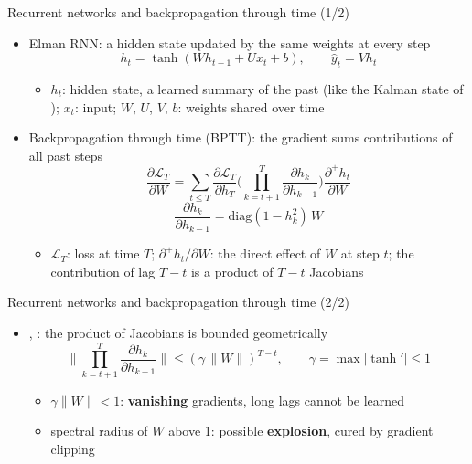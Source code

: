 \begin{frame}{Recurrent networks and backpropagation through time (1/2)}
\itemsize{\small}
\begin{itemize}
    \item Elman RNN: a hidden state updated by the same weights at every step
    \[ h_t = \tanh(W h_{t-1} + U x_t + b), \qquad \hat y_t = V h_t \]
    \begin{itemize}
        \item $h_t$: hidden state, a learned summary of the past (like the Kalman state of ); $x_t$: input; $W$, $U$, $V$, $b$: weights shared over time
    \end{itemize}
    \item Backpropagation through time (BPTT): the gradient sums contributions of all past steps
    \[ \frac{\partial\mathcal L_T}{\partial W} = \sum_{t\le T}\frac{\partial\mathcal L_T}{\partial h_T}\Big(\prod_{k=t+1}^T\frac{\partial h_k}{\partial h_{k-1}}\Big)\frac{\partial^+ h_t}{\partial W} \]
    \[ \frac{\partial h_k}{\partial h_{k-1}} = \mathrm{diag}(1 - h_k^2)\,W \]
    \begin{itemize}
        \item $\mathcal L_T$: loss at time $T$; $\partial^+h_t/\partial W$: the direct effect of $W$ at step $t$; the contribution of lag $T - t$ is a product of $T - t$ Jacobians
    \end{itemize}
\end{itemize}
\end{frame}

\begin{frame}{Recurrent networks and backpropagation through time (2/2)}
\itemsize{\small}
\begin{itemize}
    \item {}, : the product of Jacobians is bounded geometrically
    \[ \Big\|\prod_{k=t+1}^T\frac{\partial h_k}{\partial h_{k-1}}\Big\| \le (\gamma\,\|W\|)^{T-t}, \qquad \gamma = \max|\tanh'| \le 1 \]
    \begin{itemize}
        \item $\gamma\|W\| < 1$: \textbf{vanishing} gradients, long lags cannot be learned
        \item spectral radius of $W$ above 1: possible \textbf{explosion}, cured by gradient clipping
    \end{itemize}
\end{itemize}
\end{frame}

